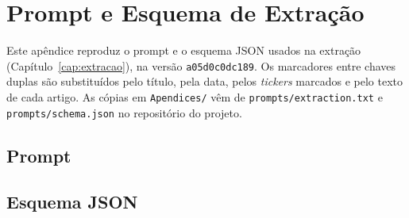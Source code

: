 \chapter{Prompt e Esquema de Extração}
\label{ap:prompt}

Este apêndice reproduz o prompt e o esquema JSON usados na extração (Capítulo~\ref{cap:extracao}),
na versão \texttt{a05d0c0dc189}. Os marcadores entre chaves duplas são substituídos pelo título, pela
data, pelos \emph{tickers} marcados e pelo texto de cada artigo. As cópias em \texttt{Apendices/} vêm de
\texttt{prompts/extraction.txt} e \texttt{prompts/schema.json} no repositório do projeto.

\section{Prompt}


\section{Esquema JSON}


\clearpage
